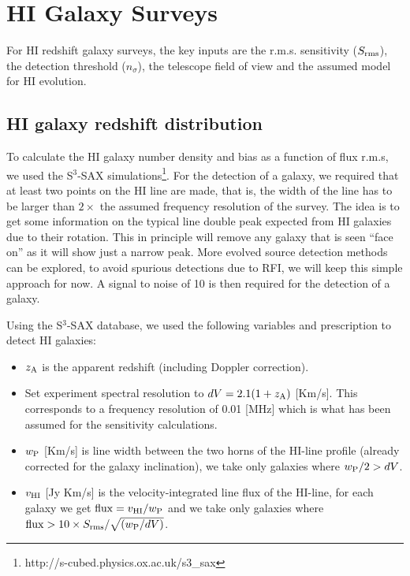 \documentclass[useAMS,usenatbib]{mn2e}
\begin{document}
\section{HI Galaxy Surveys}



For HI redshift galaxy surveys, the key inputs are \citep{Abdalla:2009wr}
the r.m.s. sensitivity ($S_{\rm{rms}}$), the detection threshold ($ n_{\sigma}$), the telescope field of view and the assumed model for HI evolution.


\subsection{HI galaxy redshift distribution}



To calculate the HI galaxy number density and bias as a function of flux r.m.s, we used the S$^3$-SAX simulations\footnote{http://s-cubed.physics.ox.ac.uk/s3\_sax}. For the detection of a galaxy, we required that at least two points on the HI line are made, that is, the width of the line has to be larger than $2\times$ the assumed frequency resolution of the survey. The idea is to get some information on the typical line double peak expected from HI 
galaxies due to their rotation. This in principle will remove any galaxy that is seen \enquote{face  on}  as it will show just a narrow peak. More evolved source detection methods can be explored, to avoid spurious detections due to RFI, we will keep this simple approach for now. A signal to noise of 10 is then required for the detection of a galaxy.

Using the S$^3$-SAX database, we used the following variables and prescription to detect HI galaxies:
\begin{itemize}
\item
$z_{\rm A}$ is  the apparent redshift (including Doppler correction).
\item
Set experiment spectral resolution to $dV = 2.1(1+z_{\rm A})$ [Km/s]. This corresponds to a frequency resolution of 0.01 [MHz] which is what has been assumed for the sensitivity calculations.
\item
$w_{\rm P}$ [Km/s]  is line width between the two horns of the HI-line profile (already corrected for the galaxy inclination), we take only galaxies where $w_{\rm P}/2 > dV$.
\item
$v_{\rm HI}$ [Jy Km/s] is the velocity-integrated line flux of the HI-line, for each galaxy we get ${\rm flux} =  v_{\rm HI} /w_{\rm P}$ and we take only galaxies where ${\rm flux}>10\times S_{\rm rms}/\sqrt{(w_{\rm P}/dV)}$.
\end{itemize}
\end{document}
